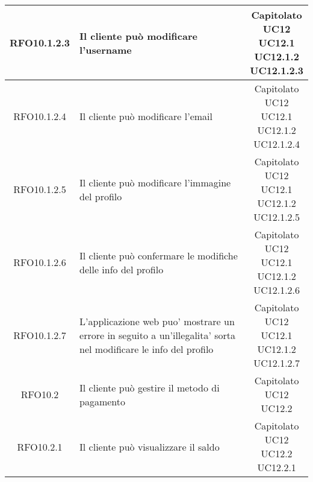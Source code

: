 \begin{longtable}{|c|p{8cm}|c|}
\hypertarget{RFO10.1.2.3}{RFO10.1.2.3} &  Il cliente può modificare l'username & \makecell*{Capitolato\\UC12\\UC12.1\\UC12.1.2\\UC12.1.2.3} \\
\hline

\hypertarget{RFO10.1.2.4}{RFO10.1.2.4} &  Il cliente può modificare l'email & \makecell*{Capitolato\\UC12\\UC12.1\\UC12.1.2\\UC12.1.2.4} \\
\hline

\hypertarget{RFO10.1.2.5}{RFO10.1.2.5} &  Il cliente può modificare l'immagine del profilo & \makecell*{Capitolato\\UC12\\UC12.1\\UC12.1.2\\UC12.1.2.5} \\
\hline

\hypertarget{RFO10.1.2.6}{RFO10.1.2.6} &  Il cliente può confermare le modifiche delle info del profilo & \makecell*{Capitolato\\UC12\\UC12.1\\UC12.1.2\\UC12.1.2.6} \\
\hline

\hypertarget{RFO10.1.2.7}{RFO10.1.2.7} &  L'applicazione web puo' mostrare un errore in seguito a un'illegalita' sorta nel modificare le info del profilo & \makecell*{Capitolato\\UC12\\UC12.1\\UC12.1.2\\UC12.1.2.7} \\
\hline

\hypertarget{RFO10.2}{RFO10.2} &  Il cliente può gestire il metodo di pagamento & \makecell*{Capitolato\\UC12\\UC12.2} \\
\hline

\hypertarget{RFO10.2.1}{RFO10.2.1} &  Il cliente può visualizzare il saldo & \makecell*{Capitolato\\UC12\\UC12.2\\UC12.2.1} \\
\hline


\end{longtable}
